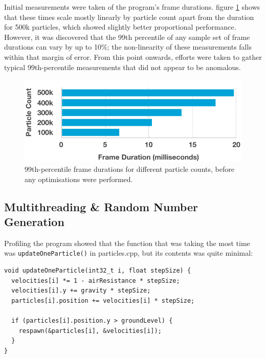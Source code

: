 \documentclass[11pt, a4paper, twocolumn]{article}
\begin{document}

Initial measurements were taken of the program's frame durations. figure \ref{fig:initialtimes} shows that these times scale mostly linearly by particle count apart from the duration for 500k particles, which showed slightly better proportional performance. However, it was discovered that the 99th percentile of any sample set of frame durations can vary by up to 10\%; the non-linearity of these measurements falls within that margin of error. From this point onwards, efforts were taken to gather typical 99th-percentile measurements that did not appear to be anomalous.

\begin{figure}[h]
\includegraphics[width=\linewidth]{initialtimes}
\caption{99th-percentile frame durations for different particle counts, before any optimisations were performed.}
\label{fig:initialtimes}
\end{figure}

\subsection{Multithreading \& Random Number Generation} \label{sec:multithread}

Profiling the program showed that the function that was taking the most time was \verb|updateOneParticle()| in particles.cpp, but its contents was quite minimal:

\begin{verbatim}
void updateOneParticle(int32_t i, float stepSize) {
  velocities[i] *= 1 - airResistance * stepSize;
  velocities[i].y += gravity * stepSize;
  particles[i].position += velocities[i] * stepSize;

  if (particles[i].position.y > groundLevel) {
    respawn(&particles[i], &velocities[i]);
  }
}
\end{verbatim}
\end{document}
